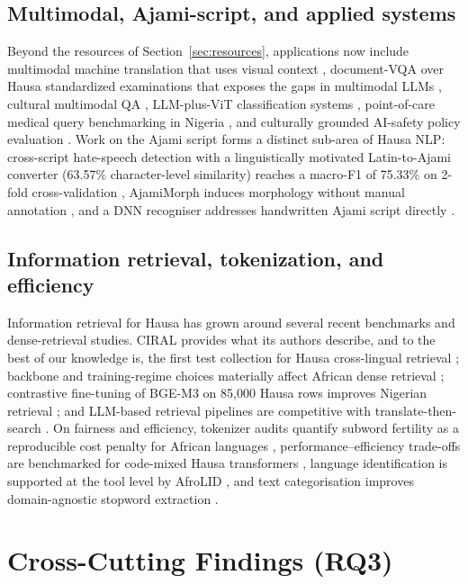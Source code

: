 \documentclass[sn-basic,pdflatex]{sn-jnl}
\begin{document}
\subsection{Multimodal, Ajami-script, and applied systems}
Beyond the resources of Section~\ref{sec:resources}, applications now include multimodal machine translation that uses visual context \citep{p036}, document-VQA over Hausa standardized examinations that exposes the gaps in multimodal LLMs \citep{p037}, cultural multimodal QA \citep{p144}, LLM-plus-ViT classification systems \citep{p149}, point-of-care medical query benchmarking in Nigeria \citep{p147}, and culturally grounded AI-safety policy evaluation \citep{p148}. Work on the Ajami script forms a distinct sub-area of Hausa NLP: cross-script hate-speech detection with a linguistically motivated Latin-to-Ajami converter (63.57\% character-level similarity) reaches a macro-F1 of 75.33\% on 2-fold cross-validation \citep{p002}, AjamiMorph induces morphology without manual annotation \citep{p023}, and a DNN recogniser addresses handwritten Ajami script directly \citep{p145}.

\subsection{Information retrieval, tokenization, and efficiency}
Information retrieval for Hausa has grown around several recent benchmarks and dense-retrieval studies. CIRAL provides what its authors describe, and to the best of our knowledge is, the first test collection for Hausa cross-lingual retrieval \citep{p008}; backbone and training-regime choices materially affect African dense retrieval \citep{p009}; contrastive fine-tuning of BGE-M3 on 85{,}000 Hausa rows improves Nigerian retrieval \citep{p010}; and LLM-based retrieval pipelines are competitive with translate-then-search \citep{p011}. On fairness and efficiency, tokenizer audits quantify subword fertility as a reproducible cost penalty for African languages \citep{p019,p152}, performance--efficiency trade-offs are benchmarked for code-mixed Hausa transformers \citep{p142}, language identification is supported at the tool level by AfroLID \citep{p153}, and text categorisation improves domain-agnostic stopword extraction \citep{p154}.

\section{Cross-Cutting Findings (RQ3)}\label{sec:findings}
\end{document}
